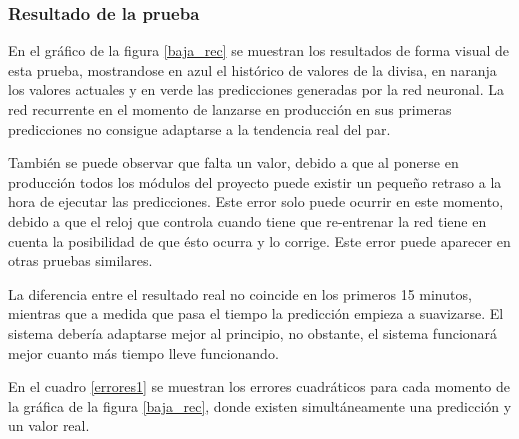 \subsubsection*{Resultado de la prueba}

En el gráfico de la figura \ref{baja_rec} se muestran los resultados de forma visual de esta prueba, mostrandose en azul el histórico de valores de la divisa, en naranja los valores actuales y en verde las predicciones generadas por la red neuronal. La red recurrente en el momento de lanzarse en producción en sus primeras predicciones no consigue adaptarse a la tendencia real del par.

También se puede observar que falta un valor, debido a que al ponerse en producción todos los módulos del proyecto puede existir un pequeño retraso a la hora de ejecutar las  predicciones. Este error solo puede ocurrir en este momento, debido a que el reloj que controla cuando tiene que re-entrenar la red tiene en cuenta la posibilidad de que ésto ocurra y lo corrige. Este error puede aparecer en otras pruebas similares. 

La diferencia entre el resultado real no coincide en los primeros 15 minutos, mientras que a medida que pasa el tiempo la predicción empieza a suavizarse. El sistema debería adaptarse mejor al principio, no obstante, el sistema funcionará mejor cuanto más tiempo lleve funcionando.

En el cuadro  \ref{errores1} se muestran los errores cuadráticos para cada momento de la gráfica de la figura \ref{baja_rec}, donde existen simultáneamente una predicción y un valor real.


